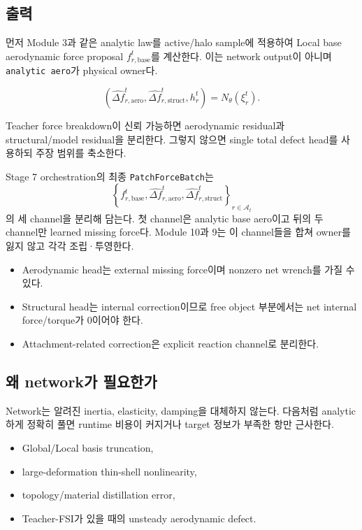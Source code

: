 \documentclass[11pt,a4paper]{article}
\begin{document}
\subsection*{출력}

먼저 Module 3과 같은 analytic law를 active/halo sample에 적용하여
Local base aerodynamic force proposal \(f_{r,\mathrm{base}}^t\)를 계산한다.
이는 network output이 아니며 \texttt{analytic aero}가 physical owner다.

\begin{equation}
  (\widehat{\Delta f}_{r,\mathrm{aero}}^t,
   \widehat{\Delta f}_{r,\mathrm{struct}}^t,
   h_r^t)
  =
  N_\theta(\xi_r^t).
  \label{eq:missing-force-net}
\end{equation}

Teacher force breakdown이 신뢰 가능하면 aerodynamic residual과 structural/model residual을 분리한다.
그렇지 않으면 single total defect head를 사용하되 주장 범위를 축소한다.

Stage 7 orchestration의 최종 \texttt{PatchForceBatch}는
\begin{equation}
  \left\{
    f_{r,\mathrm{base}}^t,
    \widehat{\Delta f}_{r,\mathrm{aero}}^t,
    \widehat{\Delta f}_{r,\mathrm{struct}}^t
  \right\}_{r\in\mathcal A_t}
\end{equation}
의 세 channel을 분리해 담는다.
첫 channel은 analytic base aero이고 뒤의 두 channel만 learned missing force다.
Module 10과 9는 이 channel들을 합쳐 owner를 잃지 않고 각각 조립·투영한다.

\begin{itemize}[leftmargin=1.5em]
  \item Aerodynamic head는 external missing force이며 nonzero net wrench를 가질 수 있다.
  \item Structural head는 internal correction이므로 free object 부분에서는 net internal force/torque가 0이어야 한다.
  \item Attachment-related correction은 explicit reaction channel로 분리한다.
\end{itemize}

\subsection*{왜 network가 필요한가}

Network는 알려진 inertia, elasticity, damping을 대체하지 않는다.
다음처럼 analytic하게 정확히 풀면 runtime 비용이 커지거나 target 정보가 부족한 항만 근사한다.

\begin{itemize}[leftmargin=1.5em]
  \item Global/Local basis truncation,
  \item large-deformation thin-shell nonlinearity,
  \item topology/material distillation error,
  \item Teacher-FSI가 있을 때의 unsteady aerodynamic defect.
\end{itemize}
\end{document}
